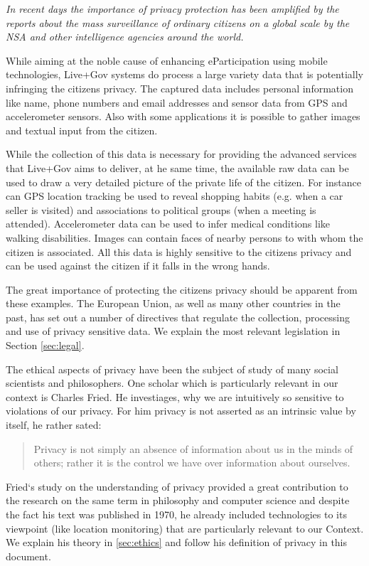 \documentclass[runningheads,a4paper]{llncs}
\newenvironment{LGContent}
{ \par\color{blue} \it \small }
{ \par }
\begin{document}
\begin{LGContent}
In recent days the importance of privacy protection has been amplified
by the reports about the mass surveillance of ordinary citizens on a
global scale by the NSA and other intelligence agencies around the
world.

While aiming at the noble cause of enhancing eParticipation using
mobile technologies, Live+Gov systems do process a large variety data
that is potentially infringing the citizens privacy. The captured data
includes personal information like name, phone numbers and email
addresses and sensor data from GPS and accelerometer sensors. Also
with some applications it is possible to gather images and textual
input from the citizen.

While the collection of this data is necessary for providing the
advanced services that Live+Gov aims to deliver, at he same time, the
available raw data can be used to draw a very detailed picture of the
private life of the citizen. For instance can GPS location tracking be
used to reveal shopping habits (e.g. when a car seller is visited) and
associations to political groups (when a meeting is
attended). Accelerometer data can be used to infer medical conditions
like walking disabilities. Images can contain faces of nearby persons
to with whom the citizen is associated. All this data is highly
sensitive to the citizens privacy and can be used against the citizen
if it falls in the wrong hands.

The great importance of protecting the citizens privacy should be
apparent from these examples. The European Union, as well as many
other countries in the past, has set out a number of directives that
regulate the collection, processing and use of privacy sensitive
data. We explain the most relevant legislation in Section
\ref{sec:legal}.

The ethical aspects of privacy have been the subject of study of many
social scientists and philosophers. One scholar which is particularly
relevant in our context is Charles Fried. He investiages, why we are
intuitively so sensitive to violations of our privacy. For him privacy
is not asserted as an intrinsic value by itself, he rather sated:

\begin{quote}
Privacy is not simply an absence of information about us in the minds of others;
rather it is the control we have over information about ourselves.
\end{quote}

Fried`s study on the understanding of privacy provided a great
contribution to the research on the same term in philosophy and
computer science and despite the fact his text was published in 1970,
he already included technologies to its viewpoint (like location
monitoring) that are particularly relevant to our Context.  We explain
his theory in \ref{sec:ethics} and follow his definition of privacy in
this document.


\end{LGContent}
\end{document}
